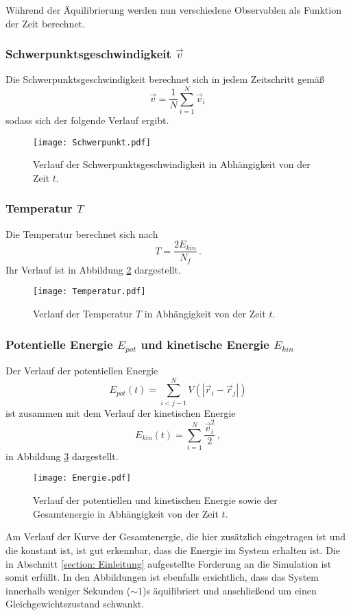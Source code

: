 Während der Äquilibrierung werden nun verschiedene Observablen als Funktion der Zeit berechnet.
\subsubsection*{Schwerpunktsgeschwindigkeit $\vec{v}$}
Die Schwerpunktsgeschwindigkeit berechnet sich in jedem Zeitschritt gemäß
\begin{equation*}
    \vec{v} = \frac{1}{N} \sum_{i = 1}^{N} \vec{v}_i \, 
\end{equation*}
sodass sich der folgende Verlauf ergibt.
\FloatBarrier
\begin{figure}[H]
    \centering
    \texttt{[image: Schwerpunkt.pdf]}
    \caption{Verlauf der Schwerpunktsgeschwindigkeit in Abhängigkeit von der Zeit $t$.}
    \label{fig:v}
\end{figure}
\FloatBarrier
\noindent
\subsubsection*{Temperatur $T$}
Die Temperatur berechnet sich nach
\begin{equation*}
    T = \frac{2 E_{kin}}{N_f} \, .
\end{equation*}
Ihr Verlauf ist in Abbildung \ref{fig:T} dargestellt.
\FloatBarrier
\begin{figure}[H]
    \centering
    \texttt{[image: Temperatur.pdf]}
    \caption{Verlauf der Temperatur $T$ in Abhängigkeit von der Zeit $t$.}
    \label{fig:T}
\end{figure}
\FloatBarrier
\noindent
\subsubsection*{Potentielle Energie $E_{pot}$ und kinetische Energie $E_{kin}$}
Der Verlauf der potentiellen Energie 
\begin{equation*}
    E_{pot}(t) = \sum_{i < j-1}^{N} V\left(\left|\vec{r}_i - \vec{r}_j\right|\right)
\end{equation*}
ist zusammen mit dem Verlauf der kinetischen Energie
\begin{equation*}
   E_{kin}(t) = \sum_{i = 1}^{N} \frac{\vec{v}_i^2}{2} \, ,
\end{equation*}
in Abbildung \ref{fig:E} dargestellt.
\FloatBarrier
\begin{figure}[H]
    \centering
    \texttt{[image: Energie.pdf]}
    \caption{Verlauf der potentiellen und kinetischen Energie sowie der Gesamtenergie in Abhängigkeit von der Zeit $t$.}
    \label{fig:E}
\end{figure}
\FloatBarrier
\noindent
Am Verlauf der Kurve der Gesamtenergie, die hier zusätzlich eingetragen ist und die konstant ist, ist gut erkennbar, dass die Energie im System erhalten ist.
Die in Abschnitt \ref{section: Einleitung} aufgestellte Forderung an die Simulation ist somit erfüllt.
In den Abbildungen ist ebenfalls ersichtlich, dass das System innerhalb weniger Sekunden ($\sim 1$)s äquilibriert und anschließend um einen Gleichgewichtszustand schwankt.


